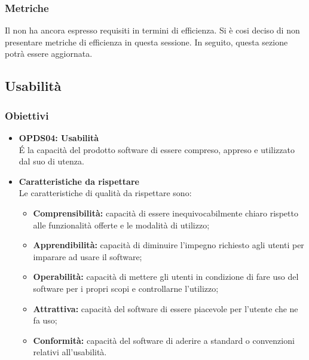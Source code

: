 \subsubsection{Metriche}
Il  {\Proponente} non ha ancora espresso requisiti in termini di efficienza. Si è cosi deciso di non presentare metriche di efficienza in questa sessione. In seguito, questa sezione potrà essere aggiornata.

\subsection{Usabilità}
\subsubsection{Obiettivi}
\begin{itemize}
	\item \textbf{OPDS04: Usabilità} \\
	É la capacità del prodotto software di essere compreso, appreso e utilizzato dal suo  di utenza.
	\item \textbf{Caratteristiche da rispettare} \\
	Le caratteristiche di qualità da rispettare sono:
	\begin{itemize}
		\item \textbf{Comprensibilità:} capacità di essere inequivocabilmente chiaro rispetto alle funzionalità offerte e le modalità di utilizzo;
		\item \textbf{Apprendibilità:} capacità di diminuire l'impegno richiesto agli utenti per imparare ad usare il software;
		\item \textbf{Operabilità:} capacità di mettere gli utenti in condizione di fare uso del software per i propri scopi e controllarne l'utilizzo;
		\item \textbf{Attrattiva:} capacità del software di essere piacevole per l'utente che ne fa uso;
		\item \textbf{Conformità:} capacità del software di aderire a standard o convenzioni relativi all'usabilità.
	\end{itemize}
\end{itemize}


